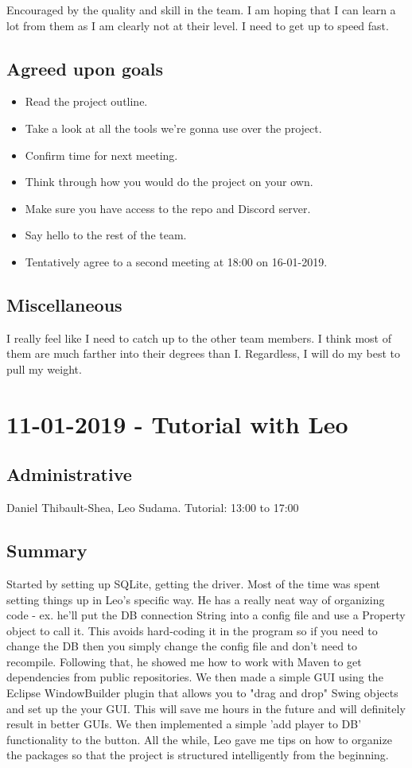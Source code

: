 \documentclass[12pt]{article}
\begin{document}
Encouraged by the quality and skill in the team. I am hoping that I can learn a lot from them as I am clearly not at their level. I need to get up to speed fast.

\subsection{Agreed upon goals}
\begin{itemize}
\item Read the project outline.
\item Take a look at all the tools we're gonna use over the project.
\item Confirm time for next meeting.
\item Think through how you would do the project on your own. 
\item Make sure you have access to the repo and Discord server. 
\item Say hello to the rest of the team.
\item Tentatively agree to a second meeting at 18:00 on 16-01-2019.
\end{itemize}

\subsection{Miscellaneous}
I really feel like I need to catch up to the other team members. I think most of them are much farther into their degrees than I. Regardless, I will do my best to pull my weight.

\pagebreak

\section{11-01-2019 - Tutorial with Leo}

\subsection{Administrative}
Daniel Thibault-Shea, Leo Sudama.
Tutorial: 13:00 to 17:00

\subsection{Summary}
Started by setting up SQLite, getting the driver. Most of the time was spent setting things up in Leo's specific way. He has a really neat way of organizing code - ex. he'll put the DB connection String into a config file and use a Property object to call it. This avoids hard-coding it in the program so if you need to change the DB then you simply change the config file and don't need to recompile. Following that, he showed me how to work with Maven to get dependencies from public repositories. We then made a simple GUI using the Eclipse WindowBuilder plugin that allows you to "drag and drop" Swing objects and set up the your GUI. This will save me hours in the future and will definitely result in better GUIs. We then implemented a simple 'add player to DB' functionality to the button. All the while, Leo gave me tips on how to organize the packages so that the project is structured intelligently from the beginning.
\end{document}
